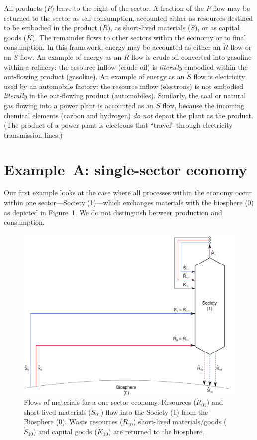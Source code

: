 All products ($\dot{P}$) leave to the right of the sector. 
A fraction of the $\dot{P}$ flow may be returned 
to the sector as self-consumption, 
accounted either as resources destined 
to be embodied in the product ($\dot{R}$), 
as short-lived materials ($\dot{S}$), 
or as capital goods ($\dot{K}$).
The remainder flows to other sectors within the economy 
or to final consumption. 
In this framework, energy may be accounted
as either an $\dot{R}$ flow or an $\dot{S}$ flow.
An example of energy as an $\dot{R}$ flow is crude oil converted into
gasoline within a refinery: 
the resource inflow (crude oil) is
\emph{literally} embodied within the out-flowing product (gasoline).
An example of energy as an $\dot{S}$ flow is electricity
used by an automobile factory: the resource inflow (electrons)
is not embodied \emph{literally} in the out-flowing product (automobiles).
Similarly, the coal or natural gas flowing into a
power plant is accounted as an $\dot{S}$ flow, 
because the incoming chemical elements (carbon and hydrogen) \emph{do
not} depart the plant as the product.  
(The product of a power plant is electrons that ``travel'' through
electricity transmission lines.)


\section{Example~A: single-sector economy} %
\label{sec:A_materials}

Our first example looks at the case where 
all processes within the economy occur within
one sector---Society (1)---which exchanges materials 
with the biosphere (0) as depicted in
Figure~\ref{fig:A_materials}.  
We do not distinguish between production and consumption.

\begin{figure}[!ht]
\centering{}
\includegraphics[width=0.8\linewidth]{Part_1/Chapter_Materials/images/1_sector_materials.pdf}
\caption[Flows of materials for a one-sector economy]{Flows of materials 
for a one-sector economy. 
Resources ($\dot{R}_{01}$) and short-lived materials 
($\dot{S}_{01}$) flow into the Society (1) 
from the Biosphere (0). Waste resources 
($\dot{R}_{10}$) short-lived materials/goods 
($\dot{S}_{10}$) and capital goods 
($\dot{K}_{10}$) are returned to the biosphere.}
\label{fig:A_materials}
\end{figure}

